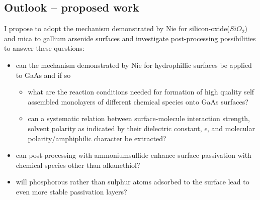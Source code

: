 \documentclass[a4paper]{article}
\begin{document}
\subsection*{Outlook -- proposed work}
I propose to adopt the mechanism demonstrated by Nie for silicon-oxide($SiO_2$) and mica to gallium arsenide surfaces and investigate post-processing possibilities to answer these questions:
\begin{itemize}
\item can the mechanism demonstrated by Nie for hydrophillic surfaces be applied to GaAs and if so
	\begin{itemize}
	\item what are the reaction conditions needed for formation of high quality self assembled monolayers of different chemical species onto GaAs surfaces? 
	\item can a systematic relation between surface-molecule interaction strength, solvent polarity as indicated by their dielectric constant, $\epsilon$, and molecular polarity/amphiphilic character be extracted?
	\end{itemize}
\item can post-processing with ammoniumsulfide enhance surface passivation with chemical species other than alkanethiol?
\item will phosphorous rather than sulphur atoms adsorbed to the surface lead to even more stable passivation layers?
\end{itemize}
\end{document}
